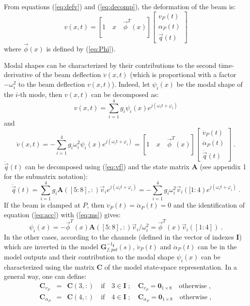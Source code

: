 \documentclass[smallcondensed]{svjour3}     %
\begin{document}
From equations (\ref{eq:defv}) and  (\ref{eq:decomp}), the deformation of the beam is:
\[
v(x,t)=[1\quad x \quad \vec{\phi}^T(x)]\left[\begin{array}{c} v_P(t) \\ \alpha_P(t) \\ \vec{q}(t)\end{array}\right]
\]
where $\vec{\phi}(x)$ is defined by (\ref{eq:Phi}). 

Modal shapes can be characterized by their contributions to the second time-derivative of the beam deflection $\ddot{v}(x,t)$ (which is proportional with  a factor $-\omega_i^2$ to the beam deflection $v(x,t)$). Indeed, let $\psi_i(x)$ be the modal shape of the $i$-th mode, then $v(x,t)$ can be decomposed as:
\[
v(x,t)=\sum_{i=1}^4g_i\psi_i(x)e^{j(\omega_it+\varphi_i)}
\]
and
\begin{equation}\label{eq:acc}
\ddot{v}(x,t)=-\sum_{i=1}^4g_i\omega_i^2\psi_i(x)e^{j(\omega_it+\varphi_i)}=[1\quad x \quad \vec{\phi}^T(x)]\left[\begin{array}{c} \ddot{v}_P(t) \\ \ddot{\alpha}_P(t) \\ \ddot{\vec{q}}(t)\end{array}\right]\;.
\end{equation}
$\ddot{\vec{q}}(t)$ can be decomposed using (\ref{eq:vf}) and the state matrix $\mathbf{A}$ (see appendix 1 for the submatrix notation):
\begin{equation}\label{eq:ms}
\ddot{\vec{q}}(t)=\sum_{i=1}^4g_i\mathbf{A}([5:8],:)\vec{v}_ie^{j(\omega_it+\varphi_i)}=-\sum_{i=1}^4g_i\omega_i^2\vec{v}_i([1:4)e^{j(\omega_it+\varphi_i)}\;.
\end{equation}
If the beam is clamped at $P$, then $\ddot{v}_P(t)= \ddot{\alpha}_P(t)=0$ and the identification of equation (\ref{eq:acc}) with (\ref{eq:ms}) gives:
\[
\psi_i(x)=-\vec{\phi}^T(x)\mathbf{A}([5:8],:)\vec{v}_i/\omega_i^2=\vec{\phi}^T(x)\vec{v}_i([1:4])\;.
\]
In the other cases, according to the channels (defined in the vector of indexes  $\mathbf{I}$) which are inverted in the model  $\mathbf{G}_{f,pol}^{-1_{\mathbf{I}}}(s)$, $\ddot{v}_P(t)$ and $\ddot{\alpha}_P(t)$ can be in the model outputs and their contribution to the modal shape $\psi_i(x)$ can be characterized using the matrix $\mathbf{C}$ of the model state-space representation. In a general way, one can define:
\begin{eqnarray}\nonumber
\mathbf{C}_{v_P}&=&\mathbf{C}(3,:)\quad\mbox{if}\quad 3\in\mathbf{I}\;;\quad \mathbf{C}_{v_P}=\mathbf{0}_{1\times 8}\quad\mbox{otherwise}\;,\\\nonumber
\mathbf{C}_{\alpha_P}&=&\mathbf{C}(4,:)\quad\mbox{if}\quad 4\in\mathbf{I}\;;\quad \mathbf{C}_{\alpha_P}=\mathbf{0}_{1\times 8}\quad\mbox{otherwise}\;,
\end{eqnarray}
\end{document}
